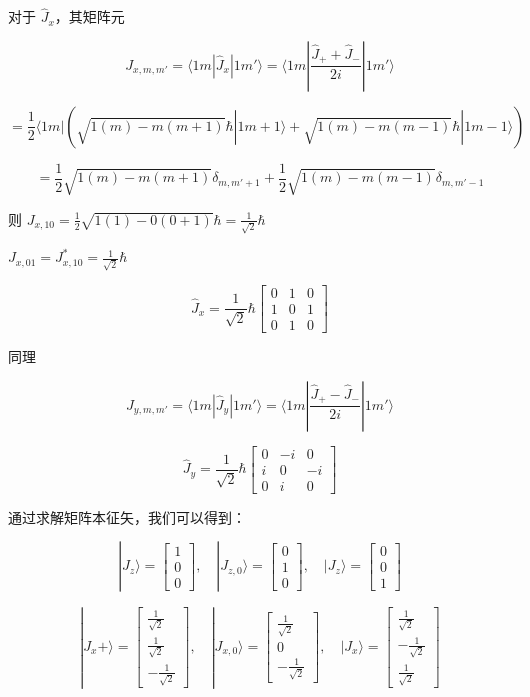 \documentclass[lang=cn,10pt]{elegantbook}
\begin{document}
对于 \(\hat{J}_x\)，其矩阵元

\[
J_{x, m, m'} = \langle 1 m | \hat{J}_x | 1 m' \rangle = \langle 1 m | \frac{\hat{J}_+ + \hat{J}_-}{2i} | 1 m' \rangle
\]

\[
= \frac{1}{2} \langle 1 m | (\sqrt{1(m) - m(m+1)} \hbar | 1 m+1 \rangle + \sqrt{1(m) - m(m-1)} \hbar | 1 m-1 \rangle)
\]

\[
= \frac{1}{2} \sqrt{1(m) - m(m+1)} \delta_{m, m'+1} + \frac{1}{2} \sqrt{1(m) - m(m-1)} \delta_{m, m'-1}
\]

则 \(J_{x, 10} = \frac{1}{2} \sqrt{1(1) - 0(0+1)} \hbar = \frac{1}{\sqrt{2}} \hbar\)

\(J_{x, 01} = J_{x, 10}^* = \frac{1}{\sqrt{2}} \hbar\)

\[
\hat{J}_x = \frac{1}{\sqrt{2}} \hbar \begin{bmatrix}
0 & 1 & 0 \\
1 & 0 & 1 \\
0 & 1 & 0
\end{bmatrix}
\]

同理

\[
J_{y, m, m'} = \langle 1 m | \hat{J}_y | 1 m' \rangle = \langle 1 m | \frac{\hat{J}_+ - \hat{J}_-}{2i} | 1 m' \rangle
\]

\[
\hat{J}_y = \frac{1}{\sqrt{2}} \hbar \begin{bmatrix}
0 & -i & 0 \\
i & 0 & -i \\
0 & i & 0
\end{bmatrix}
\]

通过求解矩阵本征矢，我们可以得到：

\[
|J_z\rangle = \begin{bmatrix} 1 \\ 0 \\ 0 \end{bmatrix}, \quad |J_{z,0}\rangle = \begin{bmatrix} 0 \\ 1 \\ 0 \end{bmatrix}, \quad |J_z\rangle = \begin{bmatrix} 0 \\ 0 \\ 1 \end{bmatrix}
\]

\[
|J_x+\rangle = \begin{bmatrix} \frac{1}{\sqrt{2}} \\ \frac{1}{\sqrt{2}} \\ -\frac{1}{\sqrt{2}} \end{bmatrix}, \quad |J_{x,0}\rangle = \begin{bmatrix} \frac{1}{\sqrt{2}} \\ 0 \\ -\frac{1}{\sqrt{2}} \end{bmatrix}, \quad |J_x\rangle = \begin{bmatrix} \frac{1}{\sqrt{2}} \\ -\frac{1}{\sqrt{2}} \\ \frac{1}{\sqrt{2}} \end{bmatrix}
\]
\end{document}
